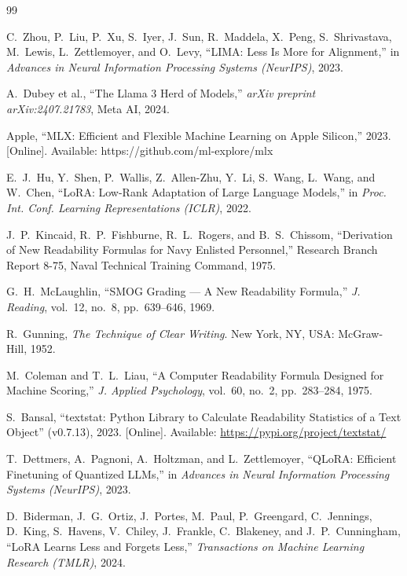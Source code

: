 \documentclass[journal]{IEEEtai}
\begin{document}
\begin{thebibliography}{99}

C.~Zhou, P.~Liu, P.~Xu, S.~Iyer, J.~Sun, R.~Maddela, X.~Peng, S.~Shrivastava, M.~Lewis, L.~Zettlemoyer, and O.~Levy, ``LIMA: Less Is More for Alignment,'' in \textit{Advances in Neural Information Processing Systems (NeurIPS)}, 2023.

A.~Dubey et al., ``The Llama 3 Herd of Models,'' \textit{arXiv preprint arXiv:2407.21783}, Meta AI, 2024.

Apple, ``MLX: Efficient and Flexible Machine Learning on Apple Silicon,'' 2023. [Online]. Available: https://github.com/ml-explore/mlx

E.~J.~Hu, Y.~Shen, P.~Wallis, Z.~Allen-Zhu, Y.~Li, S.~Wang, L.~Wang, and W.~Chen, ``LoRA: Low-Rank Adaptation of Large Language Models,'' in \textit{Proc. Int. Conf. Learning Representations (ICLR)}, 2022.

J.~P.~Kincaid, R.~P.~Fishburne, R.~L.~Rogers, and B.~S.~Chissom, ``Derivation of New Readability Formulas for Navy Enlisted Personnel,'' Research Branch Report 8-75, Naval Technical Training Command, 1975.

G.~H.~McLaughlin, ``SMOG Grading --- A New Readability Formula,'' \textit{J. Reading}, vol.~12, no.~8, pp.~639--646, 1969.

R.~Gunning, \textit{The Technique of Clear Writing}. New York, NY, USA: McGraw-Hill, 1952.

M.~Coleman and T.~L.~Liau, ``A Computer Readability Formula Designed for Machine Scoring,'' \textit{J. Applied Psychology}, vol.~60, no.~2, pp.~283--284, 1975.

S.~Bansal, ``textstat: Python Library to Calculate Readability Statistics of a Text Object'' (v0.7.13), 2023. [Online]. Available: \url{https://pypi.org/project/textstat/}

T.~Dettmers, A.~Pagnoni, A.~Holtzman, and L.~Zettlemoyer, ``QLoRA: Efficient Finetuning of Quantized LLMs,'' in \textit{Advances in Neural Information Processing Systems (NeurIPS)}, 2023.

D.~Biderman, J.~G.~Ortiz, J.~Portes, M.~Paul, P.~Greengard, C.~Jennings, D.~King, S.~Havens, V.~Chiley, J.~Frankle, C.~Blakeney, and J.~P.~Cunningham, ``LoRA Learns Less and Forgets Less,'' \textit{Transactions on Machine Learning Research (TMLR)}, 2024.


\end{thebibliography}
\end{document}
